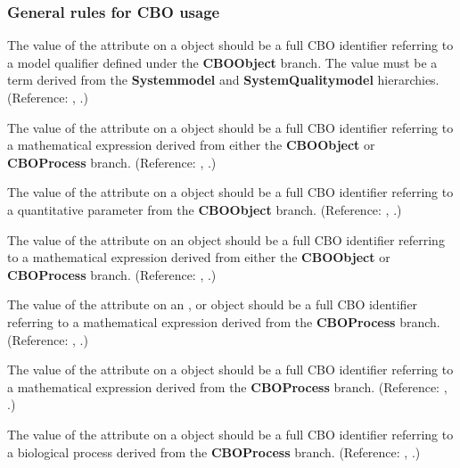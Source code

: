 \subsubsection*{General rules for CBO usage} 

 {The value of the attribute  on a \Model object should be a full CBO identifier referring to a model qualifier defined under the \textbf{CBO\textunderscore Object} branch. The value must be a term derived from the \textbf{System\textemdash model} and \textbf{SystemQuality\textemdash model} hierarchies. (Reference: \sbmlthreedynamic, .)}

 {The value of the attribute  on a \FunctionDefinition object should be a full CBO identifier referring to a mathematical expression derived from either the \textbf{CBO\textunderscore Object} or \textbf{CBO\textunderscore Process} branch. (Reference: \sbmlthreedynamic, .)}

 {The value of the attribute  on a \Parameter object should be a full CBO identifier referring to a quantitative parameter from the \textbf{CBO\textunderscore Object} branch.  (Reference: \sbmlthreedynamic, .)}

 {The value of the attribute  on an \InitialAssignment object should be a full CBO identifier referring to a mathematical expression derived from either the \textbf{CBO\textunderscore Object} or \textbf{CBO\textunderscore Process} branch. (Reference: \sbmlthreedynamic, .)}

 {The value of the attribute  on an \AlgebraicRule, \RateRule or \AssignmentRule object should be a full CBO identifier referring to a mathematical expression derived from the \textbf{CBO\textunderscore Process} branch. (Reference: \sbmlthreedynamic, .)}

 {The value of the attribute  on a \Constraint object should be a full CBO identifier referring to a mathematical expression derived from the \textbf{CBO\textunderscore Process} branch. (Reference: \sbmlthreedynamic, .)}

 {The value of the attribute  on a \Reaction object should be a full CBO identifier referring to a biological process derived from the \textbf{CBO\textunderscore Process} branch.  (Reference: \sbmlthreedynamic, .)}

